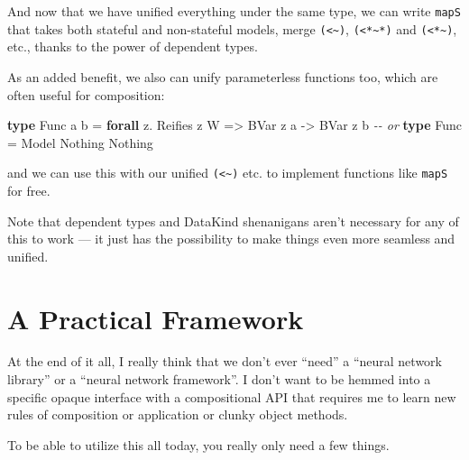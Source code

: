 \documentclass[]{article}
\newenvironment{Shaded}{}{}
\newcommand{\CommentTok}[1]{\textcolor[rgb]{0.38,0.63,0.69}{\textit{#1}}}
\newcommand{\DataTypeTok}[1]{\textcolor[rgb]{0.56,0.13,0.00}{#1}}
\newcommand{\KeywordTok}[1]{\textcolor[rgb]{0.00,0.44,0.13}{\textbf{#1}}}
\newcommand{\NormalTok}[1]{#1}
\newcommand{\OperatorTok}[1]{\textcolor[rgb]{0.40,0.40,0.40}{#1}}
\newcommand{\OtherTok}[1]{\textcolor[rgb]{0.00,0.44,0.13}{#1}}
\begin{document}
And now that we have unified everything under the same type, we can write
\texttt{mapS} that takes both stateful and non-stateful models, merge
\texttt{(\textless{}\textasciitilde{})},
\texttt{(\textless{}*\textasciitilde{}*)} and
\texttt{(\textless{}*\textasciitilde{})}, etc., thanks to the power of dependent
types.

As an added benefit, we also can unify parameterless functions too, which are
often useful for composition:

\begin{Shaded}
\begin{Highlighting}[]
\KeywordTok{type} \DataTypeTok{Func}\NormalTok{ a b }\OtherTok{=} \KeywordTok{forall}\NormalTok{ z}\OperatorTok{.} \DataTypeTok{Reifies}\NormalTok{ z }\DataTypeTok{W} \OtherTok{=\textgreater{}} \DataTypeTok{BVar}\NormalTok{ z a }\OtherTok{{-}\textgreater{}} \DataTypeTok{BVar}\NormalTok{ z b}
\CommentTok{{-}{-} or}
\KeywordTok{type} \DataTypeTok{Func}     \OtherTok{=} \DataTypeTok{Model\textquotesingle{}} \DataTypeTok{\textquotesingle{}Nothing} \DataTypeTok{\textquotesingle{}Nothing}
\end{Highlighting}
\end{Shaded}

and we can use this with our unified \texttt{(\textless{}\textasciitilde{})}
etc. to implement functions like \texttt{mapS} for free.

Note that dependent types and DataKind shenanigans aren't necessary for any of
this to work --- it just has the possibility to make things even more seamless
and unified.

\section{A Practical Framework}\label{a-practical-framework}

At the end of it all, I really think that we don't ever ``need'' a ``neural
network library'' or a ``neural network framework''. I don't want to be hemmed
into a specific opaque interface with a compositional API that requires me to
learn new rules of composition or application or clunky object methods.

To be able to utilize this all today, you really only need a few things.
\end{document}
